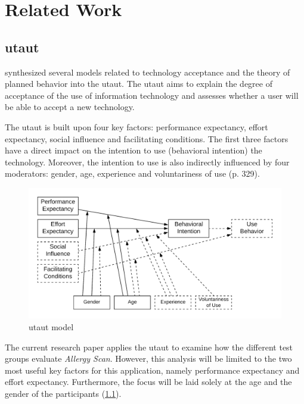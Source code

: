 \chapter{Related Work}
\label{chap:related-work}
\thispagestyle{fancy}

\section{\acrlong{utaut}} \label{sec:utaut}

\textcite{Venkatesh2016UnifiedTO} synthesized several models related to technology acceptance and the theory of planned behavior into the \acrfull{utaut}. The \acrshort{utaut} aims to explain the degree of acceptance of the use of information technology and assesses whether a user will be able to accept a new technology.

The \acrshort{utaut} is built upon four key factors: performance expectancy, effort expectancy, social influence and facilitating conditions. The first three factors have a direct impact on the intention to use (behavioral intention) the technology. Moreover, the intention to use is also indirectly influenced by four moderators: gender, age, experience and voluntariness of use (p. 329).

\begin{figure}[H]
    \centering
    \includegraphics[scale=0.2]{figures/UTAUT.png}
    \caption{\acrshort{utaut} model \parencite[p. 447]{Venkatesh2003UserAO}}
    \label{fig:utaut}
\end{figure}

The current research paper applies the \acrshort{utaut} to examine how the different test groups evaluate \emph{Allergy Scan}. However, this analysis will be limited to the two most useful key factors for this application, namely performance expectancy and effort expectancy. Furthermore, the focus will be laid solely at the age and the gender of the participants (\cref{fig:utaut}).


